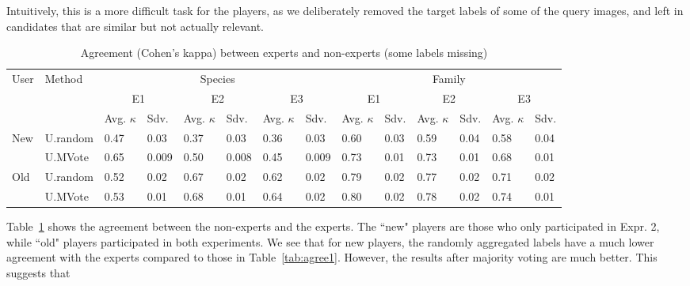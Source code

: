 Intuitively, this is a more difficult task for the players, as we deliberately removed
the target labels of some of the query images, and left in candidates that are similar but not actually relevant. 

%
\begin{table}[t!]
\centering
\begin{tabular}{@{~~}l@{~~}l@{~~}l@{~~}l@{~~~}l@{~~}l@{~~~}l@{~~}l@{~~~}l@{~~}l@{~~~}l@{~~}l@{~~~}l@{~}l@{}}
\hline
User&Method& \multicolumn{6}{c}{Species} & \multicolumn{6}{c}{Family} \\
& & \multicolumn{2}{c}{E1} & \multicolumn{2}{c}{E2} & \multicolumn{2}{c}{E3} & \multicolumn{2}{c}{E1} & \multicolumn{2}{c}{E2} & \multicolumn{2}{c}{E3} \\
& & Avg. $\kappa$ & Sdv. & Avg. $\kappa$ & Sdv. & Avg. $\kappa$ & Sdv. & Avg. $\kappa$ & Sdv. & Avg. $\kappa$ & Sdv. & Avg. $\kappa$ & Sdv.\\
\hline
\multirow{2}{*}{New}
& U.random & 0.47 & 0.03 & 0.37 & 0.03 & 0.36 & 0.03     & 0.60 & 0.03 & 0.59 & 0.04 & 0.58 & 0.04\\ 
& U.MVote & 0.65 & 0.009 & 0.50 & 0.008 & 0.45 & 0.009  & 0.73 & 0.01 & 0.73 & 0.01 & 0.68 & 0.01\\
\hline
\multirow{2}{*}{Old}
& U.random & 0.52 & 0.02 & 0.67 & 0.02 & 0.62 & 0.02 & 0.79 & 0.02 & 0.77 & 0.02 & 0.71 & 0.02\\
& U.MVote   & 0.53 & 0.01& 0.68 & 0.01 & 0.64 & 0.02 & 0.80 & 0.02 & 0.78 & 0.02 & 0.74 & 0.01\\
\hline
\end{tabular}
\caption{Agreement (Cohen's kappa) between experts and non-experts (some labels missing)}
\label{tab:agree2}
\end{table}
%
Table~\ref{tab:agree2} shows the agreement between the non-experts and the experts.
The ``new" players are those who only participated in Expr. 2, 
while ``old" players participated in both experiments.
We see that for new players, the randomly aggregated labels have a much lower agreement with the experts
compared to those in Table~\ref{tab:agree1}.
However, the results after majority voting are much better. 
%
This suggests that %
